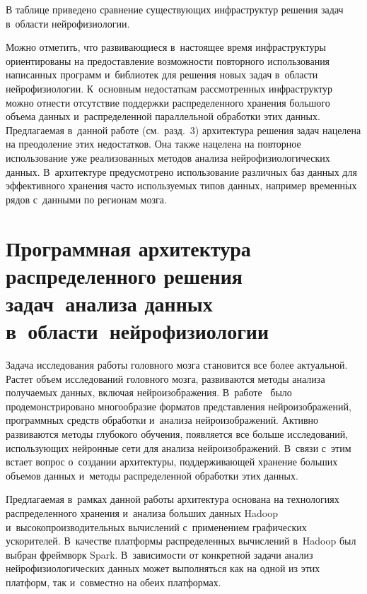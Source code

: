 \begin{multicols}{2}
    В таблице приведено сравнение существующих инфраструктур решения 
задач в~области нейрофизиологии.


    
    Можно отметить, что развивающиеся в~настоящее время 
инфраструктуры ориентированы на предостав\-ле\-ние возможности повторного 
использования написанных программ и~библиотек для решения новых задач в~области нейрофизиологии. К~основным недостаткам рассмотренных 
инфраструктур можно отнести отсутствие поддержки распределенного 
хранения большого объема данных и~распределенной параллельной 
обработки этих данных. Предлагаемая в~данной работе (см.\ разд.~3) 
архитектура решения задач нацелена на преодоление этих недостатков. Она 
также нацелена на повторное использование уже реализованных методов 
анализа нейрофизиологических данных. В~архитектуре предусмотрено 
использование различных баз данных для эффективного хранения часто 
используемых типов данных, например временн$\acute{\mbox{ы}}$х рядов с~данными по 
регионам мозга.

\section{Программная архитектура распределенного решения задач~анализа данных в~области~нейрофизиологии}

    Задача исследования работы головного мозга становится все более 
актуальной. Растет объем исследований головного мозга, развиваются 
методы анализа получаемых данных, включая ней\-ро\-изоб\-ра\-же\-ния. 
В~работе~\cite{6-st} было продемонстрировано многообразие форматов 
представления ней\-ро\-изоб\-ра\-же\-ний, программных средств обработки 
и~анализа ней\-ро\-изоб\-ра\-же\-ний. Активно развиваются методы глубокого 
обучения, появляется все больше исследований, использующих нейронные 
сети для анализа ней\-ро\-изоб\-ра\-же\-ний. В~связи с~этим встает вопрос 
о~создании архитектуры, поддерживающей хранение больших объемов 
данных и~методы распределенной обработки этих данных. 
    
    Предлагаемая в~рамках данной работы архитектура основана на 
технологиях распределенного хранения и~анализа больших данных Hadoop 
и~высокопроизводительных вычислений с~применением графических 
ускорителей. В~качестве платформы распределенных вычислений в~Hadoop 
был выбран фреймворк Spark. В~зависимости от конкретной задачи анализ 
нейрофизиологических данных может выполняться как на одной из этих 
платформ, так и~совместно на обеих платформах. 
    

\end{multicols}
